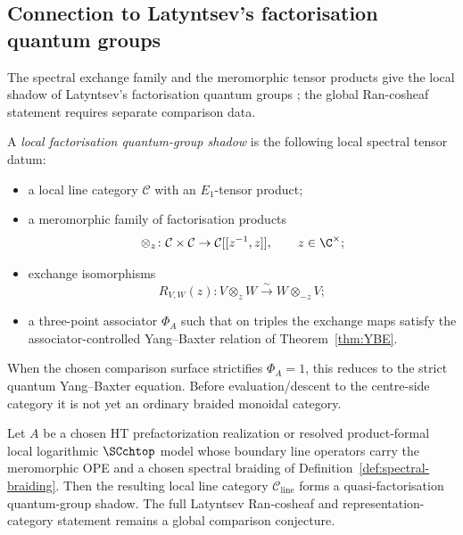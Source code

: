 \subsection{Connection to Latyntsev's factorisation quantum groups}

The spectral exchange family and the meromorphic tensor products give
the local shadow of Latyntsev's factorisation quantum groups
\cite{Lat23}; the global Ran-cosheaf statement requires separate
comparison data.

\begin{definition}
\label{def:factorisation_QG}
A \emph{local factorisation quantum-group shadow} is the following
local spectral tensor datum:
\begin{itemize}
\item a local line category $\mathcal{C}$ with an \(E_1\)-tensor
product;
\item a meromorphic family of factorisation products
\[
\otimes_z\colon \mathcal C\times\mathcal C\to
\mathcal C[[z^{-1},z]],\qquad z\in\C^\times;
\]
\item exchange isomorphisms
\[
R_{V,W}(z)\colon V\otimes_z W\xrightarrow{\sim}W\otimes_{-z}V;
\]
\item a three-point associator \(\Phi_A\) such that on triples the
exchange maps satisfy the associator-controlled Yang--Baxter relation
of Theorem~\ref{thm:YBE}.
\end{itemize}
When the chosen comparison surface strictifies \(\Phi_A=1\), this
reduces to the strict quantum Yang--Baxter equation. Before
evaluation/descent to the centre-side category it is not yet an
ordinary braided monoidal category.
\end{definition}

\begin{theorem}
\label{thm:lines_factorisationQG}
Let $A$ be a chosen HT prefactorization realization or resolved
product-formal local logarithmic $\SCchtop$ model whose boundary line
operators carry the meromorphic OPE and a chosen spectral braiding of
Definition~\ref{def:spectral-braiding}. Then the resulting local line
category $\mathcal{C}_{\text{line}}$ forms a quasi-factorisation
quantum-group shadow. The full Latyntsev Ran-cosheaf and
representation-category statement remains a global comparison
conjecture.
\end{theorem}

